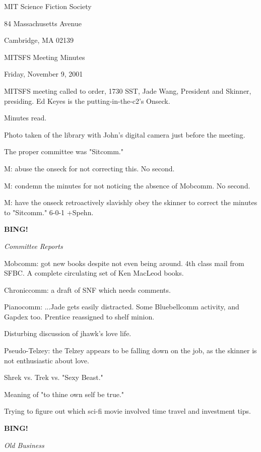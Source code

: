 \documentclass[12pt]{article}
\newcommand{\bing}{{\bf BING!} }
\newcommand{\goto}[1]{\bing \vskip 12pt \centerline{{\em{#1}}}}
\begin{document}
\begin{center}

MIT Science Fiction Society 

84 Massachusetts Avenue

Cambridge, MA 02139

\vspace{12pt}

MITSFS Meeting Minutes 

Friday, November 9, 2001

\end{center}
 
\vspace{18pt}

\setlength{\parskip}{6pt}

\noindent
MITSFS meeting called to order, 1730 SST, Jade Wang, President and Skinner, presiding. Ed Keyes is the putting-in-the-c2's Onseck.

Minutes read.

Photo taken of the library with John's digital camera just before the meeting.

The proper committee was  "Sitcomm."

M: abuse the onseck for not correcting this. No second.

M: condemn the minutes for not noticing the absence of Mobcomm. No second.

M: have the onseck retroactively slavishly obey the skinner to correct the minutes to "Sitcomm." 6-0-1 +Spehn.

\goto{Committee Reports}

Mobcomm: got new books despite not even being around. 4th class mail from SFBC. A complete circulating set of Ken MacLeod books.

Chroniccomm: a draft of SNF which needs comments.

Pianocomm: ...Jade gets easily distracted. Some Bluebellcomm activity, and Gapdex too. Prentice reassigned to shelf minion.

Disturbing discussion of jhawk's love life.

Pseudo-Telzey: the Telzey appears to be falling down on the job, as the skinner is not enthusiastic about love.

Shrek vs. Trek vs. "Sexy Beast."

Meaning of "to thine own self be true."

Trying to figure out which sci-fi movie involved time travel and investment tips.

\goto{Old Business}
\end{document}
